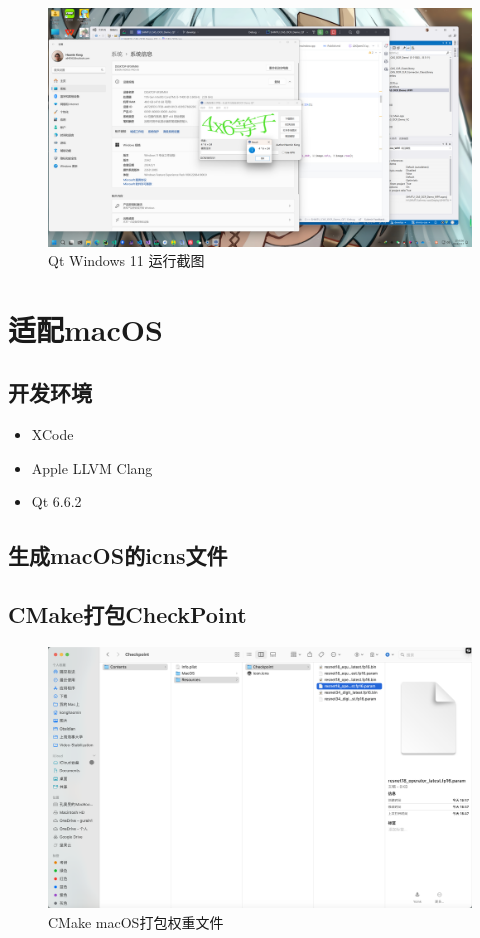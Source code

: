 \begin{figure}
	\centering
	\includegraphics[width=0.9\linewidth]{Resources/Picture/Deploy/Qt/Windows/qt_windows}
	\caption{Qt Windows 11 运行截图}
	\label{fig:qtwindows}
\end{figure}

\section{适配macOS}

\subsection{开发环境}

\begin{itemize}
	\item XCode
	\item Apple LLVM Clang
	\item Qt 6.6.2
\end{itemize}

\subsection{生成macOS的icns文件}

\subsection{CMake打包CheckPoint}

\begin{figure}
	\centering
	\includegraphics[width=0.9\linewidth]{Resources/Picture/Deploy/Qt/macOS/mac_bundle}
	\caption{CMake macOS打包权重文件}
	\label{fig:macbundle}
\end{figure}

